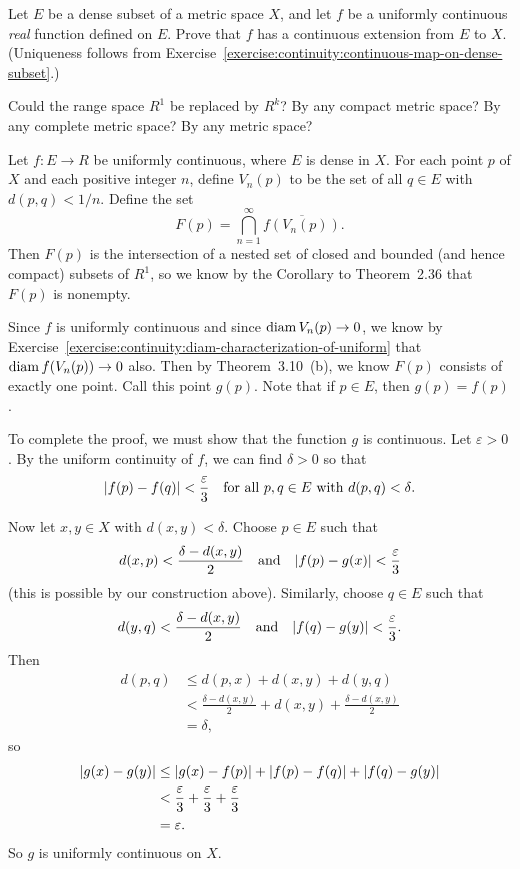  Let $E$ be a dense subset of a metric space $X$, and let
$f$ be a uniformly continuous {\em real} function defined on
$E$. Prove that $f$ has a continuous extension from $E$ to
$X$. (Uniqueness follows from
Exercise~\ref{exercise:continuity:continuous-map-on-dense-subset}.)

Could the range space $R^1$ be replaced by $R^k$? By any compact
metric space? By any complete metric space? By any metric space?
\begin{solution}
  Let $f\colon E\to R$ be uniformly continuous, where $E$ is dense in
  $X$. For each point $p$ of $X$ and each positive integer $n$, define
  $V_n(p)$ to be the set of all $q\in E$ with $d(p,q) < 1/n$. Define
  the set
  \begin{equation*}
    F(p) = \bigcap_{n=1}^\infty \overline{f(V_n(p))}.
  \end{equation*}
  Then $F(p)$ is the intersection of a nested set of closed and bounded
  (and hence compact) subsets of $R^1$, so we know by the Corollary to
  Theorem~2.36 that $F(p)$ is nonempty.

  Since $f$ is uniformly continuous and since $\operatorname{diam} V_n(p)\to 0$, we
  know by
  Exercise~\ref{exercise:continuity:diam-characterization-of-uniform}
  that $\operatorname{diam} f(V_n(p))\to 0$ also. Then by Theorem~3.10~(b), we know
  $F(p)$ consists of exactly one point. Call this point $g(p)$. Note
  that if $p\in E$, then $g(p) = f(p)$.

  To complete the proof, we must show that the function $g$ is
  continuous. Let $\varepsilon > 0$. By the uniform continuity of $f$,
  we can find $\delta > 0$ so that
  \begin{equation*}
    \lvert{f(p) - f(q)}\rvert < \frac\varepsilon3
    \quad\text{for all $p,q\in E$ with $d(p,q) < \delta$}.
  \end{equation*}

  Now let $x,y\in X$ with $d(x,y) < \delta$. Choose $p\in E$ such that
  \begin{equation*}
    d(x,p) < \frac{\delta - d(x,y)}2
    \quad\text{and}\quad
    \lvert{f(p) - g(x)}\rvert < \frac\varepsilon3
  \end{equation*}
  (this is possible by our construction above). Similarly, choose
  $q\in E$ such that
  \begin{equation*}
    d(y,q) < \frac{\delta - d(x,y)}2
    \quad\text{and}\quad
    \lvert{f(q) - g(y)}\rvert < \frac\varepsilon3.
  \end{equation*}
  Then
  \begin{align*}
    d(p,q)
    &\leq d(p,x) + d(x,y) + d(y,q) \\
    &< \frac{\delta - d(x,y)}2 + d(x,y) + \frac{\delta - d(x,y)}2 \\
    &= \delta,
  \end{align*}
  so
  \begin{align*}
    \lvert{g(x) - g(y)}\rvert
    &\leq \lvert{g(x) - f(p)}\rvert + \lvert{f(p) - f(q)}\rvert + \lvert{f(q) - g(y)}\rvert \\
    &< \frac\varepsilon3 + \frac\varepsilon3 + \frac\varepsilon3 \\
    &= \varepsilon.
  \end{align*}
  So $g$ is uniformly continuous on $X$.


\end{solution}
